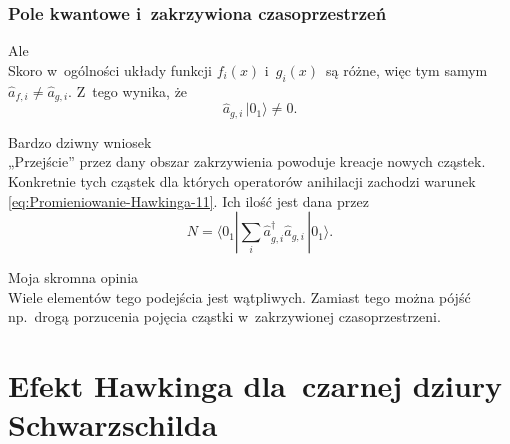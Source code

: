 \documentclass[10pt,t]{beamer}
\begin{document}
\begin{frame}
  \frametitle{Pole kwantowe i~zakrzywiona czasoprzestrzeń}


  Ale \\
  Skoro w~ogólności układy funkcji $f_{ i }( x )$ i~$g_{ i }( x )$~są różne,
  więc tym samym $\widehat{ a }_{ f, i } \neq \widehat{ a }_{ g, i }$. Z~tego
  wynika, że
  \begin{equation}
    \label{eq:Promieniowanie-Hawkinga-11}
    \widehat{ a }_{ g, i }\, | 0_{ 1 } \rangle \neq 0.
  \end{equation}

  Bardzo dziwny wniosek \\
  „Przejście” przez dany obszar zakrzywienia powoduje kreacje
  nowych cząstek. Konkretnie tych cząstek dla których operatorów
  anihilacji zachodzi warunek \eqref{eq:Promieniowanie-Hawkinga-11}. Ich
  ilość jest dana przez
  \begin{equation}
    \label{eq:Promieniowanie-Hawkinga-12}
    N =
    \langle 0_{ 1 } | \sum_{ i } \widehat{ a }_{ g, i }^{ \dagger }
    \widehat{ a }_{ g, i }\, | 0_{ 1 } \rangle.
  \end{equation}

  Moja skromna opinia \\
  Wiele elementów tego podejścia jest wątpliwych. Zamiast tego można
  pójść np.~drogą porzucenia pojęcia cząstki w~zakrzywionej
  czasoprzestrzeni.

\end{frame}










\section[Przypadek czarnej dziury Schwarzschilda]{Efekt Hawkinga
  dla~czarnej dziury Schwarzschilda}
\end{document}
